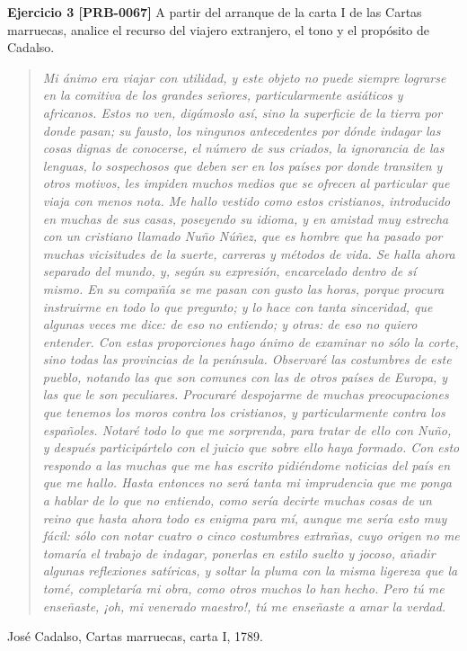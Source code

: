 \documentclass{book}
\begin{document}
\noindent\textbf{Ejercicio 3 [PRB-0067]}
A partir del arranque de la carta I de las Cartas marruecas, analice el recurso del viajero extranjero, el tono y el propósito de Cadalso.


\begin{quote}
\itshape Mi ánimo era viajar con utilidad, y este objeto no puede siempre lograrse en la comitiva de los grandes señores, particularmente asiáticos y africanos. Estos no ven, digámoslo así, sino la superficie de la tierra por donde pasan; su fausto, los ningunos antecedentes por dónde indagar las cosas dignas de conocerse, el número de sus criados, la ignorancia de las lenguas, lo sospechosos que deben ser en los países por donde transiten y otros motivos, les impiden muchos medios que se ofrecen al particular que viaja con menos nota. Me hallo vestido como estos cristianos, introducido en muchas de sus casas, poseyendo su idioma, y en amistad muy estrecha con un cristiano llamado Nuño Núñez, que es hombre que ha pasado por muchas vicisitudes de la suerte, carreras y métodos de vida. Se halla ahora separado del mundo, y, según su expresión, encarcelado dentro de sí mismo. En su compañía se me pasan con gusto las horas, porque procura instruirme en todo lo que pregunto; y lo hace con tanta sinceridad, que algunas veces me dice: de eso no entiendo; y otras: de eso no quiero entender. Con estas proporciones hago ánimo de examinar no sólo la corte, sino todas las provincias de la península. Observaré las costumbres de este pueblo, notando las que son comunes con las de otros países de Europa, y las que le son peculiares. Procuraré despojarme de muchas preocupaciones que tenemos los moros contra los cristianos, y particularmente contra los españoles. Notaré todo lo que me sorprenda, para tratar de ello con Nuño, y después participártelo con el juicio que sobre ello haya formado. Con esto respondo a las muchas que me has escrito pidiéndome noticias del país en que me hallo. Hasta entonces no será tanta mi imprudencia que me ponga a hablar de lo que no entiendo, como sería decirte muchas cosas de un reino que hasta ahora todo es enigma para mí, aunque me sería esto muy fácil: sólo con notar cuatro o cinco costumbres extrañas, cuyo origen no me tomaría el trabajo de indagar, ponerlas en estilo suelto y jocoso, añadir algunas reflexiones satíricas, y soltar la pluma con la misma ligereza que la tomé, completaría mi obra, como otros muchos lo han hecho. Pero tú me enseñaste, ¡oh, mi venerado maestro!, tú me enseñaste a amar la verdad.
\end{quote}
{\noindent\footnotesize José Cadalso, Cartas marruecas, carta I, 1789.\par}
\end{document}
